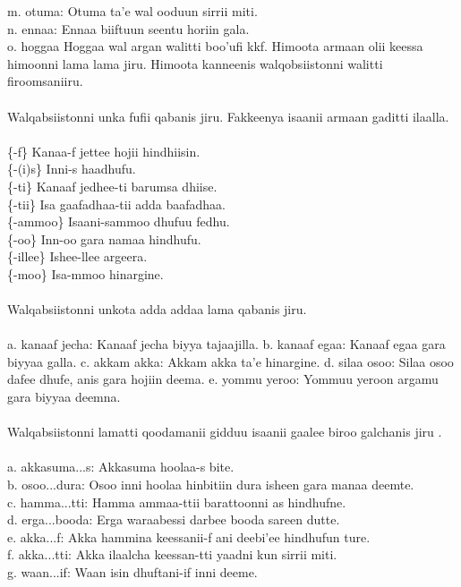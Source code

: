 \documentclass[11pt,b5paper]{book}
\begin{document}
m. otuma: Otuma ta’e wal ooduun sirrii miti.\\
n. ennaa: Ennaa biiftuun seentu horiin gala.\\
o. hoggaa Hoggaa wal argan walitti boo’ufi kkf. Himoota armaan olii keessa himoonni lama lama jiru. Himoota
kanneenis walqobsiistonni walitti firoomsaniiru.\\
\\
Walqabsiistonni unka fufii qabanis jiru. Fakkeenya isaanii armaan gaditti ilaalla. \\
\\
\{-f\} Kanaa-f jettee hojii hindhiisin.\\
\{-(i)s\} Inni-s haadhufu.\\
\{-ti\} Kanaaf jedhee-ti barumsa dhiise.\\
\{-tii\} Isa gaafadhaa-tii adda baafadhaa.\\
\{-ammoo\} Isaani-sammoo dhufuu fedhu.\\
\{-oo\} Inn-oo gara namaa hindhufu.\\
\{-illee\} Ishee-llee argeera.\\
\{-moo\} Isa-mmoo hinargine.\\
\\
Walqabsiistonni unkota adda addaa lama qabanis jiru.\\
\\
a. kanaaf jecha: Kanaaf jecha biyya tajaajilla.
b. kanaaf egaa: Kanaaf egaa gara biyyaa galla.
c. akkam akka: Akkam akka ta’e hinargine.
d. silaa osoo: Silaa osoo dafee dhufe, anis gara hojiin
deema.
e. yommu yeroo: Yommuu yeroon argamu gara biyyaa
deemna.\\
\\
Walqabsiistonni lamatti qoodamanii gidduu isaanii gaalee biroo galchanis jiru \cite[60]{griefenow2001grammatical}.\\
\\
a. akkasuma...s: Akkasuma hoolaa-s bite.\\
b. osoo...dura: Osoo inni hoolaa hinbitiin dura isheen gara manaa deemte.\\
c. hamma...tti: Hamma ammaa-ttii barattoonni as hindhufne.\\
d. erga...booda: Erga waraabessi darbee booda sareen dutte.\\
e. akka...f: Akka hammina keessanii-f ani deebi’ee hindhufun ture.\\
f. akka...tti: Akka ilaalcha keessan-tti yaadni kun sirrii miti.\\
g. waan...if: Waan isin dhuftani-if inni deeme.\\
\end{document}
